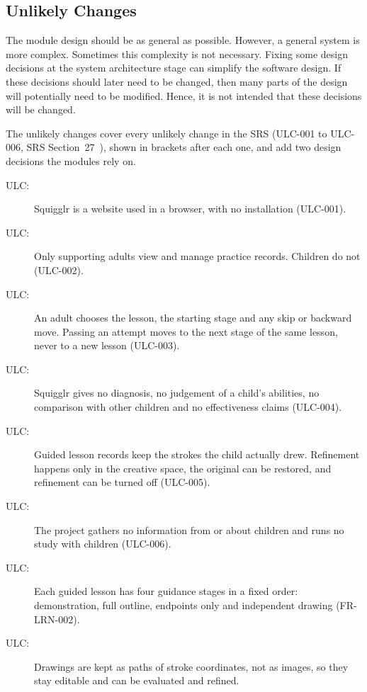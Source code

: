 \documentclass[12pt, titlepage]{article}
\newcounter{ucnum}
\newcommand{\uctheucnum}{ULC\theucnum}
\begin{document}
\subsection{Unlikely Changes} \label{SecUchange}

The module design should be as general as possible. However, a general system is
more complex. Sometimes this complexity is not necessary. Fixing some design
decisions at the system architecture stage can simplify the software design. If
these decisions should later need to be changed, then many parts of the design
will potentially need to be modified. Hence, it is not intended that these
decisions will be changed.

The unlikely changes cover every unlikely change in the SRS (ULC-001 to ULC-006,
SRS Section~27~\citep{SRS}), shown in brackets after each one, and add two
design decisions the modules rely on.

\begin{description}
\item[ \uctheucnum \label{ucWeb}:] Squigglr is a website
  used in a browser, with no installation (ULC-001).
\item[ \uctheucnum \label{ucAdultsOnly}:] Only supporting
  adults view and manage practice records. Children do not (ULC-002).
\item[ \uctheucnum \label{ucAdultChooses}:] An adult
  chooses the lesson, the starting stage and any skip or backward move. Passing
  an attempt moves to the next stage of the same lesson, never to a new lesson
  (ULC-003).
\item[ \uctheucnum \label{ucNoDiagnosis}:] Squigglr gives
  no diagnosis, no judgement of a child's abilities, no comparison with other
  children and no effectiveness claims (ULC-004).
\item[ \uctheucnum \label{ucActualStrokes}:] Guided lesson
  records keep the strokes the child actually drew. Refinement happens only in
  the creative space, the original can be restored, and refinement can be
  turned off (ULC-005).
\item[ \uctheucnum \label{ucNoChildData}:] The project
  gathers no information from or about children and runs no study with
  children (ULC-006).
\item[ \uctheucnum \label{ucStages}:] Each guided lesson
  has four guidance stages in a fixed order: demonstration, full outline,
  endpoints only and independent drawing (FR-LRN-002).
\item[ \uctheucnum \label{ucPaths}:] Drawings are kept
  as paths of stroke coordinates, not as images, so they stay editable and can
  be evaluated and refined.
\end{description}
\end{document}
